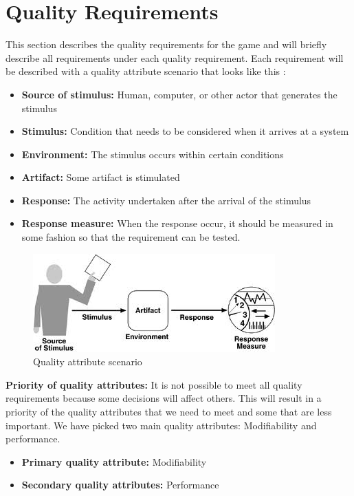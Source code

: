 \section{Quality Requirements}

This section describes the quality requirements for the game and will briefly describe all requirements under each quality requirement. Each requirement will be described with a quality attribute scenario that looks like this \cite{qualityAttribute}:

\begin{itemize}
	\item {\bf Source of stimulus:} Human, computer, or other actor that generates the stimulus
	\item {\bf Stimulus:} Condition that needs to be considered when it arrives at a system
	\item {\bf Environment:} The stimulus occurs within certain conditions
	\item {\bf Artifact:} Some artifact is stimulated 
	\item {\bf Response:} The activity undertaken after the arrival of the stimulus
	\item {\bf Response measure:} When the response occur, it should be measured in some fashion so that the requirement can be tested.
\end{itemize}

\begin{figure}[!hr]
	\includegraphics{pictures/qualityAttribute.jpg}
	\caption{Quality attribute scenario}
\end{figure}

{\bf Priority of quality attributes:} It is not possible to meet all quality requirements because some decisions will affect others. This will result in a priority of the quality attributes that we need to meet and some that are less important. We have picked two main quality attributes: Modifiability and performance.

\begin{itemize}
	\item {\bf Primary quality attribute: } Modifiability
	\item {\bf Secondary quality attributes: } Performance
\end{itemize}


